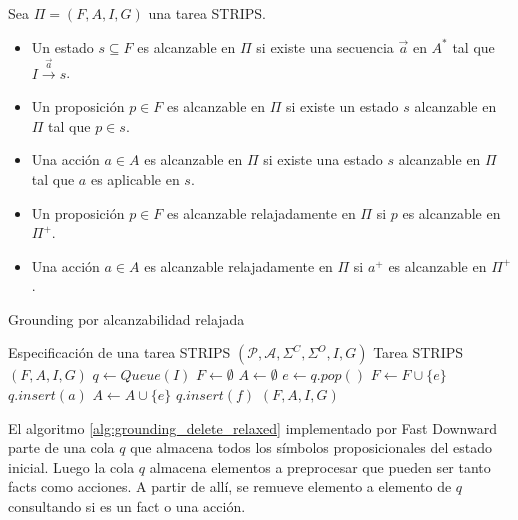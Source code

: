 \begin{mydef}
    Sea $\Pi = (F, A, I, G)$ una tarea STRIPS.    
    \begin{itemize}
        \item Un estado $s \subseteq F$ es alcanzable en $\Pi$ si existe una
        secuencia $\vec{a}$ en $A^{*}$ tal que $I \xrightarrow{\vec{a}} s$.
    
        \item Un proposición $p \in F$ es alcanzable en $\Pi$ si existe un estado
        $s$ alcanzable en $\Pi$ tal que $p \in s$.

        \item Una acción $a \in A$ es alcanzable en $\Pi$ si existe una estado $s$
        alcanzable en $\Pi$ tal que $a$ es aplicable en $s$.

        \item Un proposición $p \in F$ es alcanzable relajadamente en $\Pi$ si
        $p$ es alcanzable en $\Pi^{+}$.

        \item Una acción $a \in A$ es alcanzable relajadamente en $\Pi$ si
        $a^{+}$ es alcanzable en $\Pi^{+}$.
    \end{itemize}
\end{mydef}


\begin{algorithm}
    \caption{Grounding por alcanzabilidad
    relajada}\label{alg:grounding_delete_relaxed}
    \begin{algorithmic}[1]
    \Require Especificación de una tarea STRIPS $(\mathcal{P}, \mathcal{A},
    \Sigma^{C}, \Sigma^{O}, I, G)$
    \Ensure Tarea STRIPS $(F, A, I, G)$ 
    \State $q \gets Queue(I)$
    \State $F \gets \emptyset$
    \State $A \gets \emptyset$
    \State $e \gets q.pop()$
        \State $F \gets F \cup \{e\}$
            \State $q.insert(a)$
        \EndFor
    \Else
        \State $A \gets A \cup \{e\}$
            \State $q.insert(f)$
        \EndFor
    \EndIf
    \EndWhile
    \State \Return $(F, A, I, G)$
    \end{algorithmic}
\end{algorithm}

El algoritmo \ref{alg:grounding_delete_relaxed} implementado por Fast Downward
parte de una cola $q$ que almacena todos los símbolos proposicionales del estado
inicial. Luego la cola $q$ almacena elementos a preprocesar que pueden ser tanto facts como acciones. A partir de allí, se remueve elemento a elemento de $q$ consultando si
es un fact o una acción.

